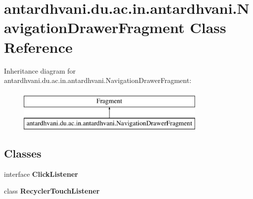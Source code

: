 \hypertarget{classantardhvani_1_1du_1_1ac_1_1in_1_1antardhvani_1_1_navigation_drawer_fragment}{}\section{antardhvani.\+du.\+ac.\+in.\+antardhvani.\+Navigation\+Drawer\+Fragment Class Reference}
\label{classantardhvani_1_1du_1_1ac_1_1in_1_1antardhvani_1_1_navigation_drawer_fragment}
Inheritance diagram for antardhvani.\+du.\+ac.\+in.\+antardhvani.\+Navigation\+Drawer\+Fragment\+:\begin{figure}[H]
\begin{center}
\leavevmode
\includegraphics[height=2.000000cm]{classantardhvani_1_1du_1_1ac_1_1in_1_1antardhvani_1_1_navigation_drawer_fragment}
\end{center}
\end{figure}
\subsection*{Classes}
\begin{DoxyCompactItemize}
\item 
interface {\bfseries Click\+Listener}
\item 
class {\bfseries Recycler\+Touch\+Listener}
\end{DoxyCompactItemize}
